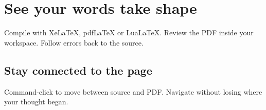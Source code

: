\section{See your words take shape}
\label{sec:preview}
Compile with XeLaTeX, pdfLaTeX or LuaLaTeX.
Review the PDF inside your workspace.
Follow errors back to the source.

\subsection{Stay connected to the page}
Command-click to move between source
and PDF. Navigate without losing
where your thought began.
